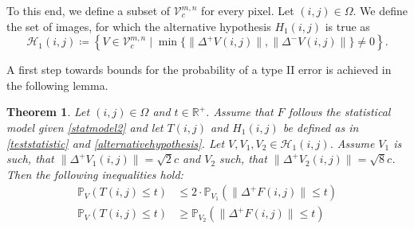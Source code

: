 \documentclass[a4paper,12pt]{article}
\newcommand{\norm}[1]{\lVert#1\rVert}
\theoremstyle{plain}
\newtheorem{theorem}{Theorem}[section]
\theoremstyle{definition}
\begin{document}
To this end, we define a subset of $\mathcal{V}_c^{m, n}$ for every pixel. Let $(i, j) \in \Omega$. We define the set of images, for which the alternative hypothesis $H_1(i, j)$ is true as
\begin{equation}\label{setH1}
	\mathcal{H}_1(i, j) \coloneqq \left\{ V \in \mathcal{V}_c^{m, n} \mid \min \{ \norm{\Delta^+ V(i, j)}, \norm{\Delta^- V(i, j)} \} \neq 0 \right\}.
\end{equation}

A first step towards bounds for the probability of a type II error is achieved in the following lemma.

\begin{theorem}\label{thm: typeIIboundssimulation}
	Let $(i, j) \in \Omega$ and $t \in \mathbb{R}^+$. Assume that $F$ follows the statistical model given \eqref{statmodel2} and let $T(i, j)$ and $H_1(i, j)$ be defined as in \eqref{teststatistic} and \eqref{alternativehypothesis}. Let $V, V_1, V_2 \in \mathcal{H}_1(i, j)$. Assume $V_1$ is such, that $\norm{\Delta^+ V_1(i, j)} = \sqrt{2} c$ and $V_2$ such, that $\norm{\Delta^+ V_2(i, j)} = \sqrt{8} c$. Then the following inequalities hold:
	\begin{align}
		\mathbb{P}_V\left( T(i, j) \leq t \right) &\leq 2 \cdot \mathbb{P}_{V_1}\left( \norm{\Delta^+ F(i, j)} \leq t \right) \label{eq: typeIIupperboundsimulation} \\
		\mathbb{P}_V\left( T(i, j) \leq t \right) &\geq \mathbb{P}_{V_2}\left( \norm{\Delta^+ F(i, j)} \leq t \right) \label{eq: typeIIlowerboundsimulation}
	\end{align}
\end{theorem}
\end{document}
